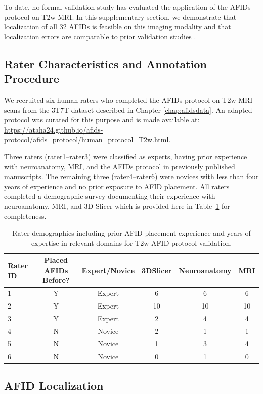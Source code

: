 To date, no formal validation study has evaluated the application of the AFIDs protocol on T2w MRI. In this supplementary section, we demonstrate that localization of all 32 AFIDs is feasible on this imaging modality and that localization errors are comparable to prior validation studies \cite{Lau2019-eh,Abbass2022-lf}.

\subsection{Rater Characteristics and Annotation Procedure}

We recruited six human raters who completed the AFIDs protocol on T2w MRI scans from the 3T7T dataset described in Chapter \ref{chap:afidsdata}. An adapted protocol was curated for this purpose and is made available at: \url{https://ataha24.github.io/afids-protocol/afids_protocol/human_protocol_T2w.html}.

Three raters (rater1–rater3) were classified as experts, having prior experience with neuroanatomy, MRI, and the AFIDs protocol in previously published manuscripts. The remaining three (rater4–rater6) were novices with less than four years of experience and no prior exposure to AFID placement. All raters completed a demographic survey documenting their experience with neuroanatomy, MRI, and 3D Slicer which is provided here in Table~\ref{tab:rater_demographics_T2w} for completeness.

\begin{table}[ht]
\centering
\caption{Rater demographics including prior AFID placement experience and years of expertise in relevant domains for T2w AFID protocol validation.}
\begin{tabular}{lccccc}
\toprule
\textbf{Rater ID} & \textbf{Placed AFIDs Before?} & \textbf{Expert/Novice} & \textbf{3DSlicer} & \textbf{Neuroanatomy} & \textbf{MRI} \\
\midrule
1 & Y & Expert & 6 & 6 & 6 \\
2 & Y & Expert & 10 & 10 & 10 \\
3 & Y & Expert & 2 & 4 & 4 \\
4 & N & Novice & 2 & 1 & 1 \\
5 & N & Novice & 1 & 3 & 4 \\
6 & N & Novice & 0 & 1 & 0 \\
\bottomrule
\end{tabular}
\label{tab:rater_demographics_T2w}
\end{table}

\subsection{AFID Localization}

